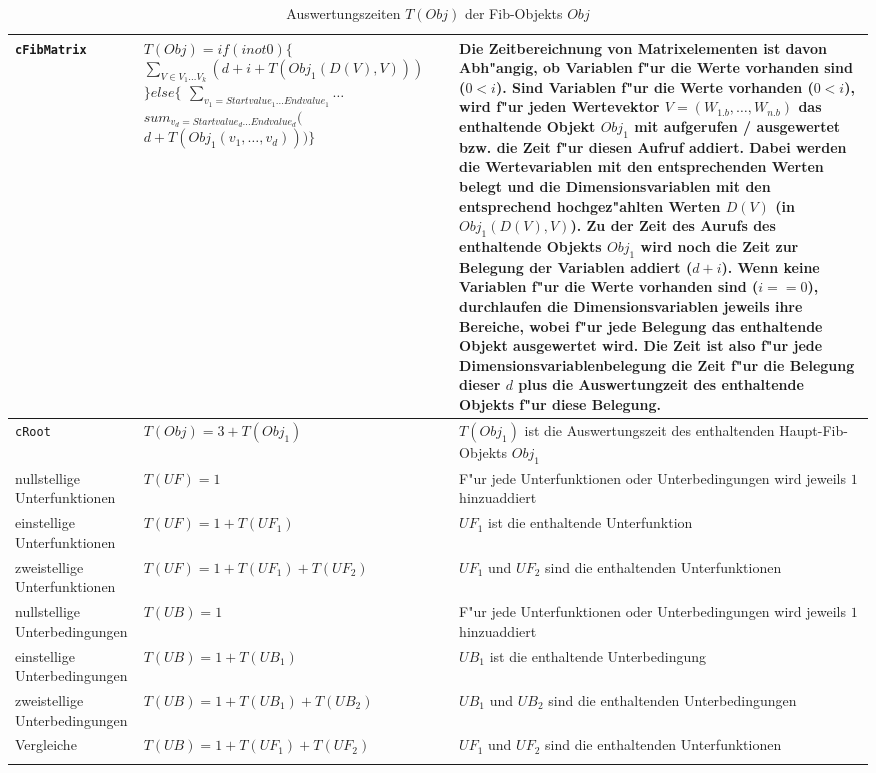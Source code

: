 \begin{center}
\begin{longtable}{|p{22mm}|p{50mm}|p{50mm}|}
	\verb|cFibMatrix| & $T(Obj)= if ( i not 0 )\{$ $\sum_{V \in V_1 \ldots V_k}( d + i + T( Obj_1(D(V),V) ) )$ $\}else\{$ $\sum_{v_1 = Startvalue_1 \ldots Endvalue_1} \ldots$ $sum_{v_d = Startvalue_d \ldots Endvalue_d} ($ $d + T( Obj_1(v_1, \ldots, v_d ) ) ) \}$ &  Die Zeitbereichnung von Matrixelementen ist davon Abh"angig, ob Variablen f"ur die Werte vorhanden sind ($0 < i$). Sind Variablen f"ur die Werte vorhanden ($0 < i$), wird f"ur jeden Wertevektor $V=(W_{1.b}, \ldots, W_{n.b})$ das enthaltende Objekt $Obj_1$ mit aufgerufen / ausgewertet bzw. die Zeit f"ur diesen Aufruf addiert. Dabei werden die Wertevariablen mit den entsprechenden Werten belegt und die Dimensionsvariablen mit den entsprechend hochgez"ahlten Werten $D(V)$ (in $Obj_1(D(V),V)$). Zu der Zeit des Aurufs des enthaltende Objekts $Obj_1$ wird noch die Zeit zur Belegung der Variablen addiert ($d + i$).    Wenn keine Variablen f"ur die Werte vorhanden sind ($i==0$), durchlaufen die Dimensionsvariablen jeweils ihre Bereiche, wobei f"ur jede Belegung das enthaltende Objekt ausgewertet wird. Die Zeit ist also f"ur jede Dimensionsvariablenbelegung die Zeit f"ur die Belegung dieser $d$ plus die Auswertungzeit des enthaltende Objekts f"ur diese Belegung. \\\hline

	\verb|cRoot|      & $T(Obj)= 3 + T(Obj_1)$ & $T(Obj_1)$ ist die Auswertungszeit des enthaltenden Haupt-Fib-Objekts $Obj_1$\\\hline

	nullstellige Unterfunktionen & $T(UF)= 1$ & F"ur jede Unterfunktionen oder Unterbedingungen wird jeweils $1$ hinzuaddiert \\\hline
	einstellige Unterfunktionen & $T(UF)= 1 + T( UF_1 )$ & $UF_1$ ist die enthaltende Unterfunktion \\\hline
	zweistellige Unterfunktionen & $T(UF)= 1 + T( UF_1 ) + T( UF_2 )$ & $UF_1$ und $UF_2$ sind die enthaltenden Unterfunktionen \\\hline

	nullstellige Unterbedingungen & $T(UB)= 1$ & F"ur jede Unterfunktionen oder Unterbedingungen wird jeweils $1$ hinzuaddiert \\\hline
	einstellige Unterbedingungen & $T(UB)= 1 + T( UB_1 )$ & $UB_1$ ist die enthaltende Unterbedingung \\\hline
	zweistellige Unterbedingungen & $T(UB)= 1 + T( UB_1 ) + T( UB_2 )$ & $UB_1$ und $UB_2$ sind die enthaltenden Unterbedingungen \\\hline
	Vergleiche & $T(UB)= 1  + T( UF_1 ) + T( UF_2 )$ & $UF_1$ und $UF_2$ sind die enthaltenden Unterfunktionen \\\hline

\caption{Auswertungszeiten $T(Obj)$ der Fib-Objekts $Obj$}
\label{tabTimeNeed}
\end{longtable}
\end{center}


